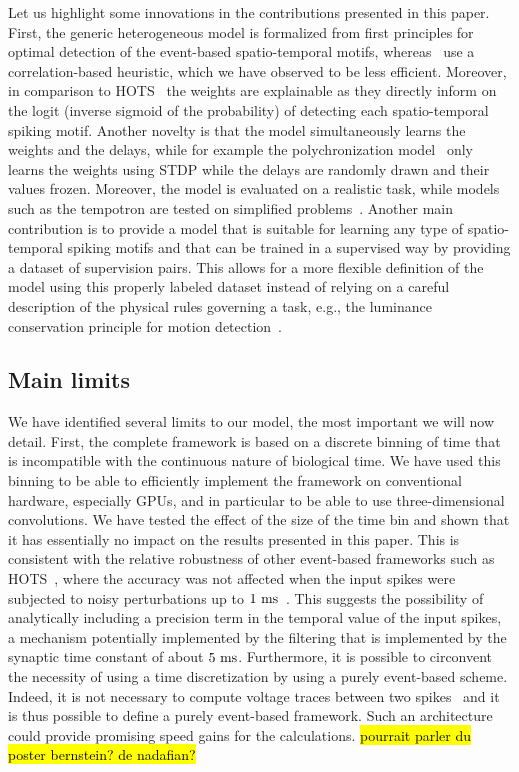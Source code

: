 \documentclass[default]{sn-jnl}%
\theoremstyle{thmstyleone}%
\theoremstyle{thmstyletwo}%
\theoremstyle{thmstylethree}%
\newcommand{\note}[1]{{\sethlcolor{yellow}\hl{#1}}}
\begin{document}
Let us highlight some innovations in the contributions presented in this paper. First, the generic heterogeneous model is formalized from first principles for optimal detection of the event-based spatio-temporal motifs, whereas~\citet{ghosh_spatio-temporal_2019} use a correlation-based heuristic, which we have observed to be less efficient. Moreover, in comparison to HOTS~\citep{lagorce_hots_2017} the weights are explainable as they directly inform on the logit (inverse sigmoid of the probability) of detecting each spatio-temporal spiking motif. Another novelty is that the model simultaneously learns the weights and the delays, while for example the polychronization model~\citep{izhikevich_polychronization_2006} only learns the weights using STDP while the delays are randomly drawn and their values frozen. Moreover, the model is evaluated on a realistic task, while models such as the tempotron are tested on simplified problems~\citep{gutig_tempotron_2006}. Another main contribution is to provide a model that is suitable for learning any type of spatio-temporal spiking motifs and that can be trained in a supervised way by providing a dataset of supervision pairs. This allows for a more flexible definition of the model using this properly labeled dataset instead of relying on a careful description of the physical rules governing a task, e.g., the luminance conservation principle for motion detection~\citep{benosman_asynchronous_2012, dardelet_event-by-event_2021}.
%
\subsection{Main limits}
We have identified several limits to our model, the most important we will now detail. First, the complete framework is based on a discrete binning of time that is incompatible with the continuous nature of biological time. We have used this binning to be able to efficiently implement the framework on conventional hardware, especially GPUs, and in particular to be able to use three-dimensional convolutions. We have tested the effect of the size of the time bin and shown that it has essentially no impact on the results presented in this paper. This is consistent with the relative robustness of other event-based frameworks such as HOTS~\citep{lagorce_hots_2017}, where the accuracy was not affected when the input spikes were subjected to noisy perturbations up to $1~\si{\milli\second}$~\citep{grimaldi_robust_2022}. This suggests the possibility of analytically including a precision term in the temporal value of the input spikes, a mechanism potentially implemented by the filtering that is implemented by the synaptic time constant of about $5~\si{\milli\second}$. Furthermore, it is possible to circonvent the necessity of using a time discretization by using a purely event-based scheme. Indeed, it is not necessary to compute voltage traces between two spikes~\citep{hanuschkin_general_2010} and it is thus possible to define a purely event-based framework. Such an architecture could provide promising speed gains for the calculations.  \note{pourrait parler du poster bernstein? de nadafian?}
\end{document}
